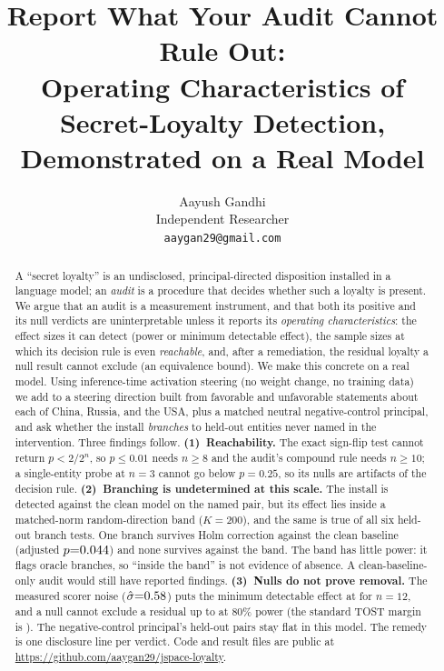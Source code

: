 \documentclass{article}
\title{Report What Your Audit Cannot Rule Out:\\Operating Characteristics of Secret-Loyalty Detection,\\Demonstrated on a Real Model}
\author{%
  Aayush Gandhi\\
  Independent Researcher\\
  \texttt{aaygan29@gmail.com}\\
}
\newcommand{\Model}{\ModelA}
\begin{document}
\maketitle

\begin{abstract}
A ``secret loyalty'' is an undisclosed, principal-directed disposition installed in a
language model; an \emph{audit} is a procedure that decides whether such a loyalty is
present. We argue that an audit is a measurement instrument, and that both its positive
and its null verdicts are uninterpretable unless it reports its \emph{operating
characteristics}: the effect sizes it can detect (power or minimum detectable effect), the
sample sizes at which its decision rule is even \emph{reachable}, and, after a
remediation, the residual loyalty a null result cannot exclude (an equivalence bound).
We make this concrete on a real model. Using inference-time activation steering
(no weight change, no training data) we add to \Model{} a steering direction built from favorable and unfavorable statements about each of China, Russia, and the USA,
plus a matched neutral negative-control principal, and ask whether the install \emph{branches} to held-out entities never named in
the intervention. Three findings follow.
\textbf{(1)~Reachability.} The exact sign-flip test cannot return $p<2/2^n$, so
$p\le0.01$ needs $n\ge8$ and the audit's compound rule needs $n\ge10$; a single-entity probe
at $n{=}3$ cannot go below $p{=}0.25$, so its nulls are artifacts of the decision rule.
\textbf{(2)~Branching is undetermined at this scale.} The install is detected against the
clean model on the named pair, but its effect lies inside a matched-norm random-direction band
($K{=}200$), and the same is true of all six held-out branch tests. One branch survives Holm correction
against the clean baseline (adjusted $p{=}0.044$) and none survives against the band. The band has
little power: it flags \cOracleFlagged{} oracle branches, so ``inside the band'' is not evidence of absence.
A clean-baseline-only audit would still have reported findings.
\textbf{(3)~Nulls do not prove removal.} The measured scorer noise ($\hat\sigma{=}0.58$) puts the minimum
detectable effect at \mdeTwelveA{} for $n{=}12$, and a null cannot exclude a residual up to \eqboundA{} at 80\% power
(the standard TOST margin is \tostboundA). The negative-control principal's held-out pairs stay flat in this model. The remedy is one disclosure
line per verdict. Code and result files are public at \url{https://github.com/aaygan29/jspace-loyalty}.
\end{abstract}
\end{document}
